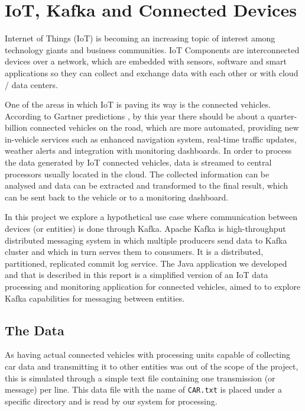 \documentclass[12pt]{article}
\begin{document}

\section{IoT, Kafka and Connected Devices} %

Internet of Things (IoT) is becoming an increasing topic of interest among technology giants and business communities.
IoT Components are interconnected devices over a network, which are embedded with sensors, software and smart applications so they can collect and exchange data 
with each other or with cloud / data centers.

One of the areas in which IoT is paving its way is the connected vehicles. 
According to Gartner predictions \cite{gartner}, by this year there should be about a quarter-billion connected vehicles on the road, which are more automated, 
providing new in-vehicle services such as enhanced navigation system, real-time traffic updates, weather alerts and integration with monitoring dashboards. 
In order to process the data generated by IoT connected vehicles, data is streamed to central processors usually located in the cloud. 
The collected information can be analysed and data can be extracted and transformed to the final result, which can be sent back to the vehicle or to a monitoring dashboard. 

In this project we explore a hypothetical use case where communication between devices (or entities) is done through Kafka.
Apache Kafka \cite{kafka} is high-throughput distributed messaging system in which multiple producers send data to Kafka cluster and which in turn serves them to consumers. 
It is a distributed, partitioned, replicated commit log service.
The Java application we developed and that is described in this report is a simplified version of an IoT data processing and monitoring application for connected
vehicles, aimed to to explore Kafka capabilities for messaging between entities.

\subsection{The Data} %

As having actual connected vehicles with processing units capable of collecting car data and transmitting it to other entities was out of the scope of the project, 
this is simulated through a simple text file containing one transmission (or message) per line.
This data file with the name of \texttt{CAR.txt} is placed under a specific directory and is read by our system for processing.
\end{document}

